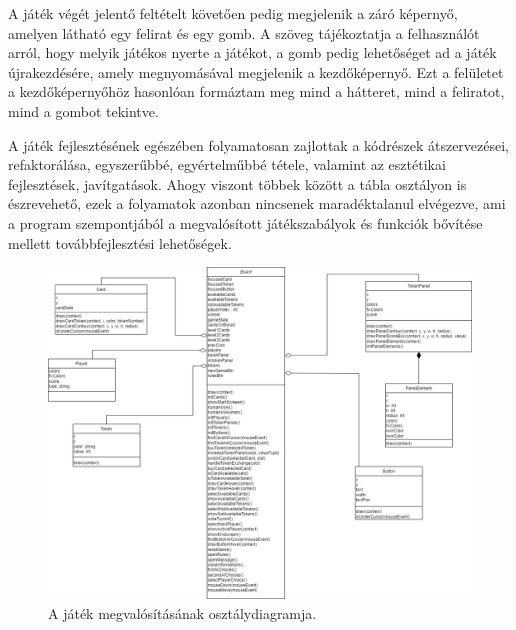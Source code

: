 \newpage


A játék végét jelentő feltételt követően pedig megjelenik a záró képernyő, amelyen látható egy felirat és egy gomb. A szöveg tájékoztatja a felhasználót arról, hogy melyik játékos nyerte a játékot, a gomb pedig lehetőséget ad a játék újrakezdésére, amely megnyomásával megjelenik a kezdőképernyő. Ezt a felületet a kezdőképernyőhöz hasonlóan formáztam meg mind a hátteret, mind a feliratot, mind a gombot tekintve.


A játék fejlesztésének egészében folyamatosan zajlottak a kódrészek átszervezései, refaktorálása, egyszerűbbé, egyértelműbbé tétele, valamint az esztétikai fejlesztések, javítgatások. Ahogy viszont többek között a tábla osztályon is észrevehető, ezek a folyamatok azonban nincsenek maradéktalanul elvégezve, ami a program szempontjából a megvalósított játékszabályok és funkciók bővítése mellett továbbfejlesztési lehetőségek.


\begin{figure}[h]
\centering
\includegraphics[scale=0.35]{images/UML.png}
\caption{A játék megvalósításának osztálydiagramja.}
\label{fig:uml}
\end{figure}

